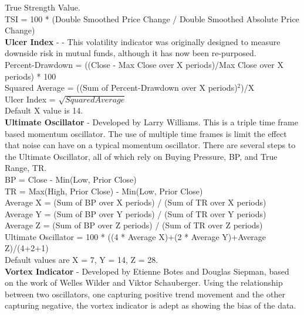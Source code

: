 \documentclass[conference]{IEEEtran}
\begin{document}
\noindent
True Strength Value.\\
TSI = 100 * (Double Smoothed Price Change / Double Smoothed Absolute Price Change)\\

\noindent
\textbf{Ulcer Index} - \cite{Martin1992} - This volatility indicator was originally designed to measure downside risk in mutual funds, although it has now been re-purposed.  \\

\noindent
Percent-Drawdown = ((Close - Max Close over X periods)/Max Close over X periods) * 100\\
Squared Average = ((Sum of Percent-Drawdown over X periods)$^2$)/X\\
Ulcer Index = $\sqrt{Squared Average}$\\
Default X value is 14.\\

\noindent
\textbf{Ultimate Oscillator} - Developed by Larry Williams. This is a triple time frame based momentum oscillator. The use of multiple time frames is limit the effect that noise can have on a typical momentum oscillator. There are several steps to the Ultimate Oscillator, all of which rely on Buying Pressure, BP, and True Range, TR.\\

\noindent
BP = Close - Min(Low, Prior Close)\\
TR = Max(High, Prior Close)  -  Min(Low, Prior Close)\\

\noindent
Average X = (Sum of BP over X periods) / (Sum of TR over X periods)\\
Average Y = (Sum of BP over Y periods) / (Sum of TR over Y periods)\\
Average Z = (Sum of BP over Z periods) / (Sum of TR over Z periods)\\

\noindent
Ultimate Oscillator = 100 * ((4 * Average X)+(2 * Average Y)+Average Z)/(4+2+1)\\
Default values are X = 7, Y = 14, Z = 28.\\

\noindent
\textbf{Vortex Indicator} - Developed by Etienne Botes and Douglas Siepman, based on the work of Welles Wilder and Viktor Schauberger. Using the relationship between two oscillators, one capturing positive trend movement and the other capturing negative, the vortex indicator is adept as showing the bias of the data.\\
\end{document}
